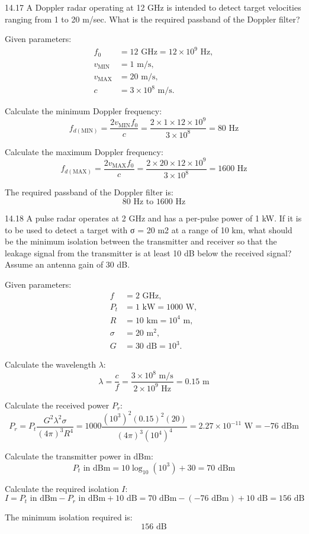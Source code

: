 \documentclass[cn,12pt]{homework}
\begin{document}
14.17 A Doppler radar operating at 12 GHz is intended to detect target velocities ranging from 1 to
20 m/sec. What is the required passband of the Doppler filter?
\begin{solution}
  Given parameters:
\begin{align*}
f_0 &= 12 \text{ GHz} = 12 \times 10^9 \text{ Hz}, \\
v_{\text{MIN}} &= 1 \text{ m/s}, \\
v_{\text{MAX}} &= 20 \text{ m/s}, \\
c &= 3 \times 10^8 \text{ m/s}.
\end{align*}

Calculate the minimum Doppler frequency:
\[ f_{d(\text{MIN})} = \frac{2 v_{\text{MIN}} f_0}{c} = \frac{2 \times 1 \times 12 \times 10^9}{3 \times 10^8} = 80 \text{ Hz} \]

Calculate the maximum Doppler frequency:
\[ f_{d(\text{MAX})} = \frac{2 v_{\text{MAX}} f_0}{c} = \frac{2 \times 20 \times 12 \times 10^9}{3 \times 10^8} = 1600 \text{ Hz} \]

The required passband of the Doppler filter is:
\[ \boxed{80 \text{ Hz} \text{ to } 1600 \text{ Hz}} \]
\end{solution}
\newpage

14.18 A pulse radar operates at 2 GHz and has a per-pulse power of 1 kW. If it is to be used to detect
a target with σ = 20 m2 at a range of 10 km, what should be the minimum isolation between the
transmitter and receiver so that the leakage signal from the transmitter is at least 10 dB below the
received signal? Assume an antenna gain of 30 dB.
\begin{solution}
  Given parameters:
\begin{align*}
f &= 2 \text{ GHz}, \\
P_t &= 1 \text{ kW} = 1000 \text{ W}, \\
R &= 10 \text{ km} = 10^4 \text{ m}, \\
\sigma &= 20 \text{ m}^2, \\
G &= 30 \text{ dB} = 10^3.
\end{align*}

Calculate the wavelength \( \lambda \):
\[ \lambda = \frac{c}{f} = \frac{3 \times 10^8 \text{ m/s}}{2 \times 10^9 \text{ Hz}} = 0.15 \text{ m} \]

Calculate the received power \( P_r \):
\[ P_r = P_t \frac{G^2 \lambda^2 \sigma}{(4\pi)^3 R^4} = 1000 \frac{(10^3)^2 (0.15)^2 (20)}{(4\pi)^3 (10^4)^4} = 2.27 \times 10^{-11} \text{ W} = -76 \text{ dBm} \]

Calculate the transmitter power in dBm:
\[ P_t \text{ in dBm} = 10 \log_{10}(10^3) + 30 = 70 \text{ dBm} \]

Calculate the required isolation \( I \):
\[ I = P_t \text{ in dBm} - P_r \text{ in dBm} + 10 \text{ dB} = 70 \text{ dBm} - (-76 \text{ dBm}) + 10 \text{ dB} = 156 \text{ dB} \]

The minimum isolation required is:
\[ \boxed{156 \text{ dB}} \]
\end{solution}
\newpage
\end{document}
